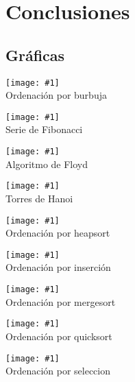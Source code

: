 \documentclass[a4paper, 11pt]{article} %
\newcommand{\imagen}[2]{\begin{figure*}[ht!] \centering \texttt{[image: \#1]} \\ #2 \end{figure*}}
\begin{document}
\section {Conclusiones}
\subsection {Gráficas}
\imagen{../regressionPlots/burbuja_fit.jpg}{Ordenación por burbuja}

\imagen{../regressionPlots/fibonacci_fit.jpg}{Serie de Fibonacci}

\imagen{../regressionPlots/floyd_fit.jpg}{Algoritmo de Floyd}

\imagen{../regressionPlots/hanoi_fit.jpg}{Torres de Hanoi}

\imagen{../regressionPlots/heapsort_fit.jpg}{Ordenación por heapsort}

\imagen{../regressionPlots/insercion_fit.jpg}{Ordenación por inserción}

\imagen{../regressionPlots/mergesort_fit.jpg}{Ordenación por mergesort}

\imagen{../regressionPlots/quicksort_fit.jpg}{Ordenación por quicksort}

\imagen{../regressionPlots/seleccion_fit.jpg}{Ordenación por seleccion}

\newpage
\end{document}
